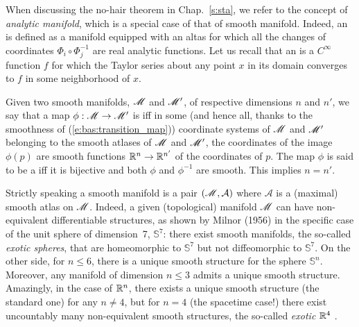 \begin{remark} \label{r:bas:analytic}
When discussing the no-hair theorem in Chap.~\ref{s:sta}, we
refer to the concept of
\emph{analytic manifold},
which is a special case of that of smooth manifold. Indeed, an
is defined as a manifold equipped with an altas for which all the changes of coordinates
$\Phi_i \circ \Phi_j^{-1}$ are real analytic functions.
Let us recall that an 
is a $C^\infty$ function $f$ for
which the Taylor series about any point $x$ in its domain converges to $f$
in some neighborhood of $x$.
\end{remark}

Given two smooth manifolds, $\mathscr{M}$ and $\mathscr{M}'$, of
respective dimensions $n$ and $n'$, we say that a map
$\phi : \mathscr{M} \rightarrow \mathscr{M}'$ is  iff in some (and hence all, thanks to the smoothness of (\ref{e:bas:transition_map})) coordinate systems
of $\mathscr{M}$ and $\mathscr{M}'$ belonging to the smooth atlases of $\mathscr{M}$ and $\mathscr{M}'$,
the coordinates of the image $\phi(p)$ are smooth functions $\mathbb{R}^n\rightarrow \mathbb{R}^{n'}$ of the coordinates of $p$.
The map $\phi$ is said to be a  iff
it is bijective and both $\phi$ and $\phi^{-1}$ are smooth. This implies $n=n'$.

\begin{remark}
Strictly speaking a smooth manifold is a pair $(\mathscr{M},\mathcal{A})$  where
$\mathcal{A}$ is a (maximal) smooth atlas on $\mathscr{M}$.
Indeed, a given (topological) manifold $\mathscr{M}$
can have non-equivalent differentiable structures, as shown by Milnor (1956) \cite{Milno56}
in the specific case of the unit sphere of dimension~7, $\mathbb{S}^7$: there exist smooth manifolds, the so-called \emph{exotic spheres},
that are homeomorphic to $\mathbb{S}^7$ but not diffeomorphic
to $\mathbb{S}^7$.  On the other side, for $n\leq 6$, there is a unique smooth
structure for the sphere $\mathbb{S}^n$.
Moreover, any manifold of dimension $n\leq 3$ admits a unique smooth structure.
Amazingly, in the case of $\mathbb{R}^n$, there exists a unique smooth structure (the standard one) for any $n\not=4$, but for $n=4$ (the spacetime case!) there exist uncountably many non-equivalent smooth structures, the so-called
\emph{exotic $\mathbb{R}^4$} \cite{Taube87}.
\end{remark}

